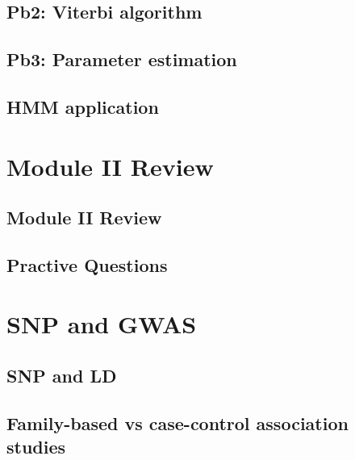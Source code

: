 \documentclass[
]{book}
\begin{document}
\hypertarget{pb2-viterbi-algorithm}{%
\section{Pb2: Viterbi algorithm}\label{pb2-viterbi-algorithm}}

\hypertarget{pb3-parameter-estimation}{%
\section{Pb3: Parameter estimation}\label{pb3-parameter-estimation}}

\hypertarget{hmm-application}{%
\section{HMM application}\label{hmm-application}}

\hypertarget{m2re}{%
\chapter{Module II Review}\label{m2re}}

\hypertarget{module-ii-review}{%
\section{Module II Review}\label{module-ii-review}}

\hypertarget{practive-questions}{%
\section{Practive Questions}\label{practive-questions}}

\hypertarget{gwas1}{%
\chapter{SNP and GWAS}\label{gwas1}}

\hypertarget{snp-and-ld}{%
\section{SNP and LD}\label{snp-and-ld}}

\hypertarget{family-based-vs-case-control-association-studies}{%
\section{Family-based vs case-control association studies}\label{family-based-vs-case-control-association-studies}}
\end{document}
